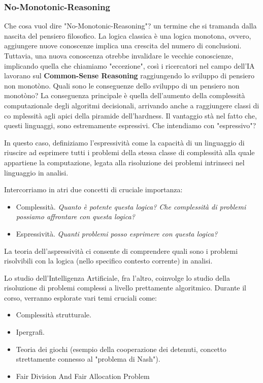\subsubsection{No-Monotonic-Reasoning}
Che cosa vuol dire "No-Monotonic-Reasoning"?  un termine che si tramanda dalla nascita del pensiero filosofico.
La logica classica è una logica monotona, ovvero, aggiungere nuove conoscenze implica una crescita del numero di conclusioni.
\newline
Tuttavia, una nuova conoscenza otrebbe invalidare le vecchie conoscienze, implicando quella che chiamiamo "eccezione", così i ricercatori
nel campo dell'IA lavorano sul \textbf{Common-Sense Reasoning} raggiungendo lo sviluppo di pensiero non monotòno.
\newline
Quali sono le conseguenze dello sviluppo di un pensiero non monotòno?
\newline
La conseguenza principale è quella dell'aumento della complessità computazionale degli algoritmi decisionali, arrivando anche a raggiungere 
classi di co mplessità agli apici della piramide dell'hardness.
Il vantaggio stà nel fatto che, questi linguaggi, sono estremamente espressivi.  
\newline
Che intendiamo con "espressivo"?
\begin{definition}
    In questo caso, definiziamo l'espressività come la capacità di un linguaggio di riuscire ad esprimere tutti i problemi della 
    stessa classe di complessità alla quale appartiene la computazione, legata alla risoluzione dei problemi intrinseci nel 
    linguaggio in analisi.
\end{definition}
Intercorriamo in atri due concetti di cruciale importanza:
\begin{itemize}
    \item Complessità. \textit{Quanto è potente questa logica? Che complessità di problemi possiamo affrontare con questa logica?}
    \item Espressività. \textit{Quanti problemi posso esprimere con questa logica?}
\end{itemize}
La teoria dell'aspressività ci consente di comprendere quali sono i problemi risolvibili con la logica (nello specifico contesto corrente) in analisi.

\newpage
Lo studio dell'Intelligenza Artificiale, fra l'altro, coinvolge lo studio della risoluzione di problemi complessi a livello prettamente algoritmico.
Durante il corso, verranno esplorate vari temi cruciali come: 
\begin{itemize}
    \item Complessità strutturale.
    \item Ipergrafi.
    \item Teoria dei giochi (esempio della cooperazione dei detenuti, concetto strettamente connesso al "problema di Nash").
    \item Fair Division And Fair Allocation Problem
\end{itemize}


